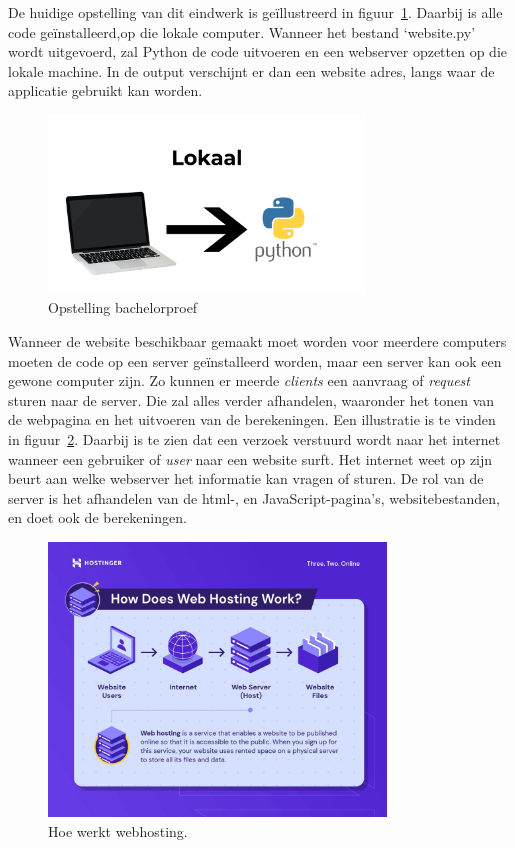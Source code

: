 De huidige opstelling van dit eindwerk is geïllustreerd in figuur~\ref{fig:opstelling_bachelorproef}. Daarbij is alle code geïnstalleerd,op die lokale computer. Wanneer het bestand `website.py' wordt uitgevoerd, zal Python de code uitvoeren en een webserver opzetten op die lokale machine. In de output verschijnt er dan een website adres, langs waar de applicatie gebruikt kan worden.

\begin{figure}
    \centering
    \includegraphics[width=0.75\textwidth]{./img/lokaal_website}
    \caption{\label{fig:opstelling_bachelorproef} Opstelling bachelorproef}
\end{figure}

Wanneer de website beschikbaar gemaakt moet worden voor meerdere computers moeten de code op een server geïnstalleerd worden, maar een server kan ook een gewone computer zijn. Zo kunnen er meerde \textit{clients} een aanvraag of \textit{request} sturen naar de server. Die zal alles verder afhandelen, waaronder het tonen van de webpagina en het uitvoeren van de berekeningen. Een illustratie is te vinden in figuur~\ref{fig:webhosting_scheme}. Daarbij is te zien dat een verzoek verstuurd wordt naar het internet wanneer een gebruiker of \textit{user} naar een website surft. Het internet weet op zijn beurt aan welke webserver het informatie kan vragen of sturen.
De rol van de server is het afhandelen van de html-, en JavaScript-pagina's, websitebestanden, en doet ook de berekeningen.

\begin{figure}
    \centering
    \includegraphics[width=0.8\textwidth]{./img/how-does-web-hosting-work}
    \caption{\label{fig:webhosting_scheme} Hoe werkt webhosting.~\autocite{Tamara2022}}
\end{figure}

